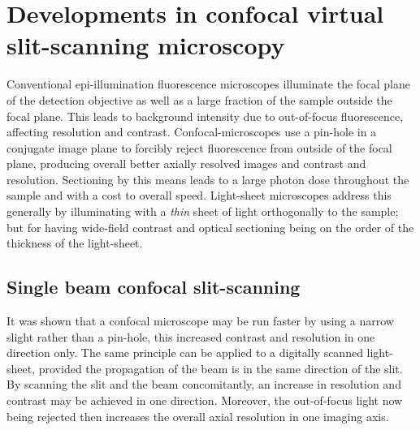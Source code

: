 \ifpdf
    \graphicspath{{Chapters/dualslit/Figs/Raster/}{Chapters/dualslit/Figs/PDF/}{Chapters/dualslit/Figs/}}
\else
    \graphicspath{{Chapters/dualslit/Figs/Vector/}{Chapters/dualslit/Figs/}}
\fi

\chapter{Developments in confocal virtual slit-scanning microscopy}\label{chapter:dualslit}


Conventional epi-illumination fluorescence microscopes illuminate the focal plane of the detection objective as well as a large fraction of the sample outside the focal plane.
This leads to background intensity due to out-of-focus fluorescence, affecting resolution and contrast.
Confocal-microscopes use a pin-hole in a conjugate image plane to forcibly reject fluorescence from outside of the focal plane, producing overall better axially resolved images and contrast and resolution.
Sectioning by this means leads to a large photon dose throughout the sample and with a cost to overall speed.
Light-sheet microscopes address this generally by illuminating with a \emph{thin} sheet of light orthogonally to the sample; but for having wide-field contrast and optical sectioning being on the order of the thickness of the light-sheet.

\section{Single beam confocal slit-scanning}

It was shown that a confocal microscope may be run faster by using a narrow slight rather than a pin-hole, this increased contrast and resolution in one direction only.
The same principle can be applied to a digitally scanned light-sheet, provided the propagation of the beam is in the same direction of the slit.
By scanning the slit and the beam concomitantly, an increase in resolution and contrast may be achieved in one direction.
Moreover, the out-of-focus light now being rejected then increases the overall axial resolution in one imaging axis.

